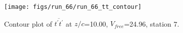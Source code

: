 \begin{figure}[H]
\centering
\texttt{[image: figs/run\_66/run\_66\_tt\_contour]}
\caption{Contour plot of $\overline{t^\prime t^\prime}$ at $z/c$=10.00, $V_{free}$=24.96, station 7.}
\end{figure}


